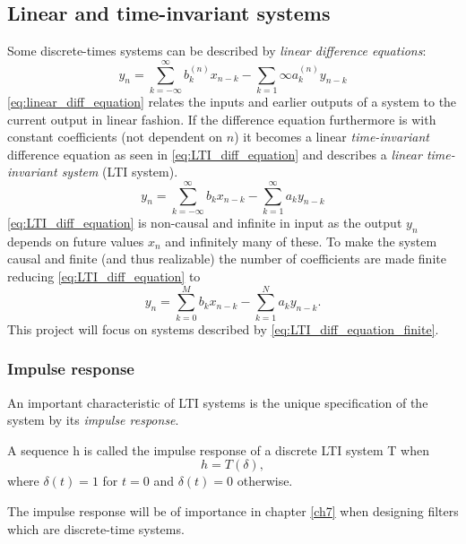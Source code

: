 \subsection{Linear and time-invariant systems}
Some discrete-times systems can be described by \textit{linear difference equations}:
\begin{equation}\label{eq:linear_diff_equation}
y_n=\sum_{k=-\infty}^{\infty}b_k^{(n)}x_{n-k}-\sum_{k=1}{\infty}a_k^{(n)}y_{n-k}
\end{equation}
\eqref{eq:linear_diff_equation} relates the inputs and earlier outputs of a system to the current output in linear fashion. If the difference equation furthermore is with constant coefficients (not dependent on $n$) it becomes a linear \textit{time-invariant} difference equation as seen in \eqref{eq:LTI_diff_equation} and describes a \textit{linear time-invariant system} (LTI system).
\begin{equation}\label{eq:LTI_diff_equation}
y_n=\sum_{k=-\infty}^{\infty}b_kx_{n-k}-\sum_{k=1}^{\infty}a_ky_{n-k}
\end{equation}
\eqref{eq:LTI_diff_equation} is non-causal and infinite in input as the output $y_n$ depends on future values $x_n$ and infinitely many of these. To make the system causal and finite (and thus realizable) the number of coefficients are made finite reducing \eqref{eq:LTI_diff_equation} to
\begin{equation}\label{eq:LTI_diff_equation_finite}
y_n=\sum_{k=0}^Mb_kx_{n-k}-\sum_{k=1}^Na_ky_{n-k}.
\end{equation}
This project will focus on systems described by \eqref{eq:LTI_diff_equation_finite}.
\subsubsection{Impulse response}
An important characteristic of LTI systems is the unique specification of the system by its \textit{impulse response}.
\begin{definition}\label{def:impulse_response}
A sequence h is called the impulse response of a discrete LTI system T when
\begin{equation}
h=T(\delta),
\end{equation}
where $\delta(t)=1$ for $t=0$ and $\delta(t)=0$ otherwise.
\end{definition}
The impulse response will be of importance in chapter \ref{ch7} when designing filters which are discrete-time systems.